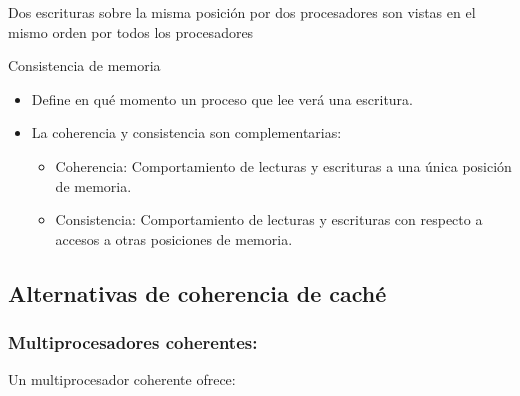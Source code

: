 \documentclass[12pt, twoside, openright]{report} %
\begin{document}
\begin{itemize}
\begin{itemize}
        

        Dos escrituras sobre la misma posición por dos procesadores
          son vistas en el mismo orden por todos los procesadores

        \end{itemize}

        Consistencia de memoria

      \begin{itemize}
      
      \item
        Define en qué momento un proceso que lee verá una escritura.
      \item
        La coherencia y consistencia son complementarias:
        \begin{itemize}
          \item Coherencia: Comportamiento de lecturas y escrituras a una
          única posición de memoria.

          \item Consistencia: Comportamiento de lecturas y escrituras con
          respecto a accesos a otras posiciones de memoria.
        \end{itemize}

        

        
        \end{itemize}
      \end{itemize}

      
\subsection{Alternativas de coherencia de caché}
\subsubsection{Multiprocesadores coherentes:}

 

      Un multiprocesador coherente ofrece:
\end{document}
